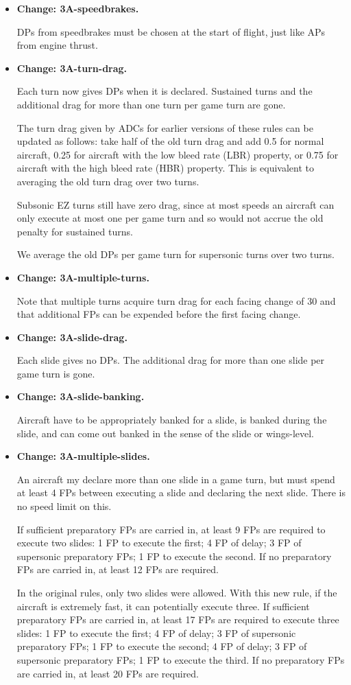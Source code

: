\documentclass[10pt]{report}
\newcommand{\itemtag}[1]{\item \textbf{Change: #1.}\par}
\begin{document}
\begin{itemize}
    \itemtag{3A-speedbrakes} DPs from speedbrakes must be chosen at the start of flight, just like APs from engine thrust.
    
    \itemtag{3A-turn-drag} Each turn now gives DPs when it is declared. Sustained turns and the additional drag for more than one turn per game turn are gone.
    
    The turn drag given by ADCs for earlier versions of these rules can be updated as follows: take half of the old turn drag and add 0.5 for normal aircraft, 0.25 for aircraft with the low bleed rate (LBR) property, or 0.75 for aircraft with the high bleed rate (HBR) property. This is equivalent to averaging the old turn drag over two turns.
    
    Subsonic EZ turns still have zero drag, since at most speeds an aircraft can only execute at most one per game turn and so would not accrue the old penalty for sustained turns.

    We average the old DPs per game turn for supersonic turns over two turns.

    \itemtag{3A-multiple-turns} Note that multiple turns acquire turn drag for each facing change of 30{\deg} and that additional FPs can be expended before the first facing change.
    
    \itemtag{3A-slide-drag} Each slide gives no DPs.  The additional drag for more than one slide per game turn is gone.
    
    \itemtag{3A-slide-banking} Aircraft have to be appropriately banked for a slide, is banked during the slide, and can come out banked in the sense of the slide or wings-level.

    \itemtag{3A-multiple-slides} An aircraft my declare more than one slide in a game turn, but must spend at least 4 FPs between executing a slide and declaring the next slide. There is no speed limit on this.
    
    If sufficient preparatory FPs are carried in, at least 9 FPs are required to execute two slides: 1 FP to execute the first; 4 FP of delay; 3 FP of supersonic preparatory FPs; 1 FP to execute the second. If no preparatory FPs are carried in, at least 12 FPs are required.

    In the original rules, only two slides were allowed. With this new rule, if the aircraft is extremely fast, it can potentially execute three. If sufficient preparatory FPs are carried in, at least 17 FPs are required to execute three slides: 1 FP to execute the first; 4 FP of delay; 3 FP of supersonic preparatory FPs; 1 FP to execute the second; 4 FP of delay; 3 FP of supersonic preparatory FPs; 1 FP to execute the third. If no preparatory FPs are carried in, at least 20 FPs are required. 


\end{itemize}
\end{document}
